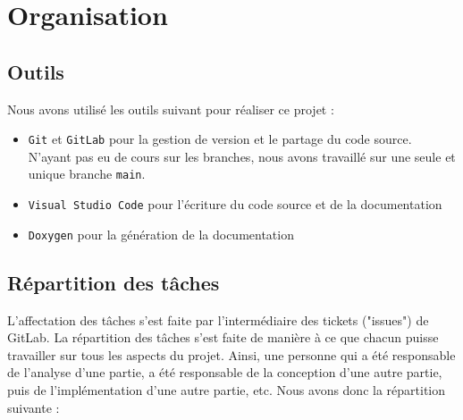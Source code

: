 \section{Organisation}

\subsection{Outils}

Nous avons utilisé les outils suivant pour réaliser ce projet :

\begin{itemize}
    \item \texttt{Git} et \texttt{GitLab} pour la gestion de version et le partage du code source. N'ayant pas eu de cours sur les branches, nous avons travaillé sur une seule et unique branche \texttt{main}.
    \item \texttt{Visual Studio Code} pour l'écriture du code source et de la documentation
    \item \texttt{Doxygen} pour la génération de la documentation
\end{itemize}

\subsection{Répartition des tâches}

L'affectation des tâches s'est faite par l'intermédiaire des tickets ("issues") de GitLab. 
La répartition des tâches s'est faite de manière à ce que chacun puisse travailler sur tous les aspects du projet. 
Ainsi, une personne qui a été responsable de l'analyse d'une partie, a été responsable de la conception d'une autre partie, puis de l'implémentation d'une autre partie, etc.
Nous avons donc la répartition suivante :

